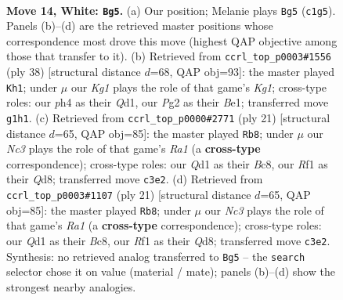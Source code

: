\documentclass[11pt]{article}
\begin{document}
\clearpage

\begin{figure}[p]\centering
\begin{subfigure}{0.46\textwidth}\centering
\resizebox{\linewidth}{!}{%
\newchessgame
\chessboard[
  setfen={rnbqkbr1/5p2/1p2pnp1/p7/P1NP3p/1BN4P/1P3PP1/R1BQ1RK1 w q - 2 14},
  showmover=false,
  pgfstyle=straightmove, color=movearrow, markmove={c1-g5}
]}
\caption{}
\end{subfigure}\hfill
\begin{subfigure}{0.46\textwidth}\centering
\resizebox{\linewidth}{!}{%
\newchessgame
\chessboard[
  setfen={r1bq2k1/1p1n1rbp/2np2p1/4p3/P1P1Pp2/R1NN1P2/4B1PP/3QBRK1 w - - 2 20},
  showmover=false,
  pgfstyle=straightmove, color=movearrow, markmove={g1-h1}
]}
\caption{}
\end{subfigure}
\\[4pt]
\begin{subfigure}{0.46\textwidth}\centering
\resizebox{\linewidth}{!}{%
\newchessgame
\chessboard[
  setfen={r1bqkb1r/5ppp/p1np4/3Np3/1pP1n3/6P1/PPN2P1P/R1BQKB1R b KQkq - 0 11},
  showmover=false,
  pgfstyle=straightmove, color=movearrow, markmove={a8-b8}
]}
\caption{}
\end{subfigure}\hfill
\begin{subfigure}{0.46\textwidth}\centering
\resizebox{\linewidth}{!}{%
\newchessgame
\chessboard[
  setfen={r1bqkb1r/5ppp/p1np4/3Np3/1pP1n3/6P1/PPN2P1P/R1BQKB1R b KQkq - 0 11},
  showmover=false,
  pgfstyle=straightmove, color=movearrow, markmove={a8-b8}
]}
\caption{}
\end{subfigure}
\caption{\textbf{Move 14, White: \texttt{Bg5}.} (a) Our position; Melanie plays \texttt{Bg5} (\texttt{c1g5}). Panels (b)--(d) are the retrieved master positions whose correspondence most drove this move (highest QAP objective among those that transfer to it). (b) Retrieved from \texttt{ccrl\_top\_p0003\#1556} (ply 38) [structural distance $d$=68, QAP obj=93]: the master played \texttt{Kh1}; under $\mu$ our \emph{Kg1} plays the role of that game's \emph{Kg1}; cross-type roles: our \emph{p}h4 as their \emph{Q}d1, our \emph{P}g2 as their \emph{B}e1; transferred move \texttt{g1h1}. (c) Retrieved from \texttt{ccrl\_top\_p0000\#2771} (ply 21) [structural distance $d$=65, QAP obj=85]: the master played \texttt{Rb8}; under $\mu$ our \emph{Nc3} plays the role of that game's \emph{Ra1} (a \textbf{cross-type} correspondence); cross-type roles: our \emph{Q}d1 as their \emph{B}c8, our \emph{R}f1 as their \emph{Q}d8; transferred move \texttt{c3e2}. (d) Retrieved from \texttt{ccrl\_top\_p0003\#1107} (ply 21) [structural distance $d$=65, QAP obj=85]: the master played \texttt{Rb8}; under $\mu$ our \emph{Nc3} plays the role of that game's \emph{Ra1} (a \textbf{cross-type} correspondence); cross-type roles: our \emph{Q}d1 as their \emph{B}c8, our \emph{R}f1 as their \emph{Q}d8; transferred move \texttt{c3e2}. Synthesis: no retrieved analog transferred to \texttt{Bg5} -- the \texttt{search} selector chose it on value (material / mate); panels (b)--(d) show the strongest nearby analogies.}
\label{fig:thought-m26}
\end{figure}
\end{document}
